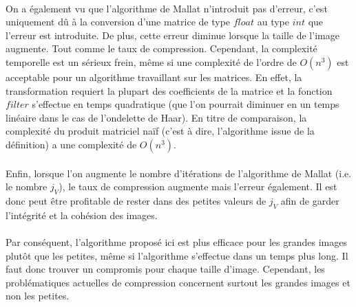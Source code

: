 \documentclass[a4paper,10pt]{report}
\theoremstyle{break}
\begin{document}
  \paragraph{} On a \'{e}galement vu que l'algorithme de Mallat n'introduit pas d'erreur, c'est uniquement d\^{u} \`{a} la conversion
      d'une matrice de type $float$ au type $int$ que l'erreur est introduite. De plus, cette erreur diminue lorsque la taille de l'image
      augmente. Tout comme le taux de compression. Cependant, la complexit\'{e} temporelle est un s\'{e}rieux frein, m\^{e}me si une 
      complexit\'{e} de l'ordre de $O(n^3)$ est acceptable pour un algorithme travaillant sur les matrices. En effet, la transformation
      requiert la plupart des coefficients de la matrice et la fonction $filter$ s'effectue en temps quadratique (que l'on pourrait
      diminuer en un temps lin\'{e}aire dans le cas de l'ondelette de Haar). En titre de comparaison, la complexit\'{e} du produit matriciel
      na\"{i}f (c'est \`{a} dire, l'algorithme issue de la d\'{e}finition) a une complexit\'{e} de $O(n^3)$.
      
  \paragraph{} Enfin, lorsque l'on augmente le nombre d'it\'{e}rations de l'algorithme de Mallat (i.e. le nombre $j_V$),
      le taux de compression augmente mais l'erreur \'{e}galement. Il est donc peut \^{e}tre profitable de rester dans des petites
      valeurs de $j_V$ afin de garder l'int\'{e}grit\'{e} et la coh\'{e}sion des images.
      
  \paragraph{} Par cons\'{e}quent, l'algorithme propos\'{e} ici est plus efficace pour les grandes images plut\^{o}t que les petites, 
      m\^{e}me si l'algorithme s'effectue dans un temps plus long. Il faut donc trouver un compromis pour chaque taille d'image.
      Cependant, les probl\'{e}matiques actuelles de compression concernent surtout les grandes images et non les petites.

\newpage
\end{document}
